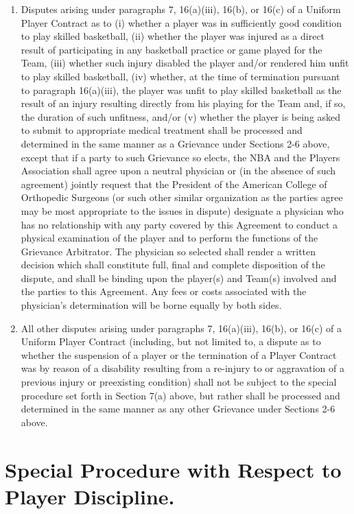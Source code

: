 \documentclass[
]{book}
\providecommand{\tightlist}{%
  \setlength{\itemsep}{0pt}\setlength{\parskip}{0pt}}
\begin{document}
\begin{enumerate}
\def\labelenumi{(\alph{enumi})}
\tightlist
\item
  Disputes arising under paragraphs 7, 16(a)(iii), 16(b), or 16(c) of a Uniform Player Contract as to (i) whether a player was in sufficiently good condition to play skilled basketball, (ii) whether the player was injured as a direct result of participating in any basketball practice or game played for the Team, (iii) whether such injury disabled the player and/or rendered him unfit to play skilled basketball, (iv) whether, at the time of termination pursuant to paragraph 16(a)(iii), the player was unfit to play skilled basketball as the result of an injury resulting directly from his playing for the Team and, if so, the duration of such unfitness, and/or (v) whether the player is being asked to submit to appropriate medical treatment shall be processed and determined in the same manner as a Grievance under Sections 2-6 above, except that if a party to such Grievance so elects, the NBA and the Players Association shall agree upon a neutral physician or (in the absence of such agreement) jointly request that the President of the American College of Orthopedic Surgeons (or such other similar organization as the parties agree may be most appropriate to the issues in dispute) designate a physician who has no relationship with any party covered by this Agreement to conduct a physical examination of the player and to perform the functions of the Grievance Arbitrator. The physician so selected shall render a written decision which shall constitute full, final and complete disposition of the dispute, and shall be binding upon the player(s) and Team(s) involved and the parties to this Agreement. Any fees or costs associated with the physician's determination will be borne equally by both sides.
\item
  All other disputes arising under paragraphs 7, 16(a)(iii), 16(b), or 16(c) of a Uniform Player Contract (including, but not limited to, a dispute as to whether the suspension of a player or the termination of a Player Contract was by reason of a disability resulting from a re-injury to or aggravation of a previous injury or preexisting condition) shall not be subject to the special procedure set forth in Section 7(a) above, but rather shall be processed and determined in the same manner as any other Grievance under Sections 2-6 above.
\end{enumerate}

\hypertarget{special-procedure-with-respect-to-player-discipline.}{%
\section{Special Procedure with Respect to Player Discipline.}\label{special-procedure-with-respect-to-player-discipline.}}
\end{document}
